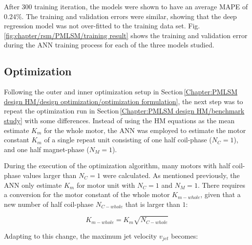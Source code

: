             
            After $300$ training iteration, the models were shown to have an average \acf{MAPE} of $0.24\%$. The training and validation errors were similar, showing that the deep regression model was not over-fitted to the training data set. Fig.\,\ref{fig:chapter/rsm/PMLSM/training result} shows the training and validation error during the \acs{ANN} training process for each of the three models studied.
            
        
        \subsection{Optimization}                   \label{Chapter:RSM/PMLSM/Optimization}
        
        
            Following the outer and inner optimization setup in Section\,\ref{Chapter:PMLSM design HM/design optimization/optimization formulation}, the next step was to repeat the optimization run in Section\,\ref{Chapter:PMLSM design HM/benchmark study} with some differences. Instead of using the \acs{HM} equations as the mean estimate $K_m$ for the whole motor, the \acs{ANN} was employed to estimate the motor constant $K_m$ of a single repeat unit consisting of one half coil-phase ($N_C = 1$), and one half magnet-phase ($N_M = 1$). 
            
            
            During the execution of the optimization algorithm, many motors with half coil-phase values larger than $N_C = 1$ were calculated. As mentioned previously, the \acs{ANN} only estimate $K_m$ for motor unit with $N_C=1$ and $N_M=1$. There requires a conversion for the motor constant of the whole motor $K_{m-whole}$, given that a new number of half coil-phase $N_{C-whole}$ that is larger than $1$:
            
            
            \begin{equation}
                K_{m-whole}=K_m  \sqrt{N_{C-whole}}
                \label{eq:calculate new K_m based on new N_C}
            \end{equation}
            
            
            Adapting to this change, the maximum jet velocity $v_{jet}$ becomes:
            
